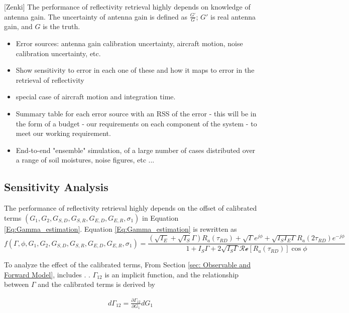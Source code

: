 \documentclass[draftcls,onecolumn]{IEEEtran}  %
\begin{document}
[Zenki]
The performance of reflectivity retrieval highly depends on knowledge of antenna gain. The uncertainty of antenna gain is defined as $\frac{G'}{G}$; $G'$ is real antenna gain, and $G$ is the truth.  
\label{sec:error}
   \begin{itemize}
     \item Error sources: antenna gain calibration uncertainty, aircraft motion, noise calibration uncertainty, etc.
     \item Show sensitivity to error in each one of these and how it maps to error in the retrieval of reflectivity
     \item special case of aircraft motion and integration time.
     \item Summary table for each error source with an RSS of the error - this will be in the form of a budget - our requirements on each component of the system - to meet our working requirement.
     \item End-to-end "ensemble" simulation, of a large number of cases distributed over a range of soil moistures, noise figures, etc ...
   \end{itemize}
   
\subsection{Sensitivity Analysis}
The performance of reflectivity retrieval highly depends on the offset of calibrated terms $(G_1, G_2, G_{S,D}, G_{S,R}, G_{E,D}, G_{E,R}, \sigma_1)$ in Equation \ref{Eq:Gamma_estimation}. Equation \ref{Eq:Gamma_estimation} is rewritten as
\begin{equation}
f(\Gamma, \phi, G_1, G_2, G_{S,D}, G_{S,R}, G_{E,D}, G_{E,R}, \sigma_1) =
	\frac{(\sqrt{I_E}+\sqrt{I_S}\Gamma)R_a(\tau_{RD})+\sqrt{\Gamma} 
    e^{j\phi}+\sqrt{I_S I_E\Gamma} R_a(2\tau_{RD})e^{-j\phi}} 
    {1 + I_S \Gamma + 2 \sqrt{I_S \Gamma} \mathcal{Re}[ R_a(\tau_{RD})] \cos \phi}
        \label{Eq:Gamma_uncertainty}
\end{equation}

To analyze the effect of the calibrated terms,  
From Section \ref{sec: Observable and Forward Model},  includes  . . $\Gamma_{12}$ is an implicit function, and the relationship between $\Gamma$ and the calibrated terms is derived by

\begin{eqnarray}
d\Gamma_{12} = \frac{\partial \Gamma_{12}}{\partial G_1} dG_1 
\end{eqnarray}
\end{document}

